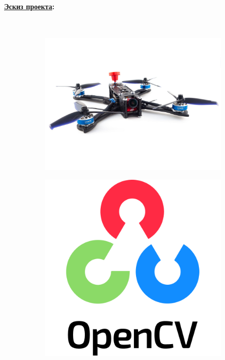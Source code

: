 \documentclass[a4paper,12pt]{article} %
\begin{document}
\paragraph{\underline{Эскиз проекта}:}\

\begin{figure}[h]
    \centering
    \begin{subfigure}{0.4\textwidth}
        \includegraphics[width=\linewidth]{../img/drone.jpg}
    \end{subfigure}
    \hfill
    \begin{subfigure}{0.2\textwidth}
        \includegraphics[width=\linewidth]{../img/opencv.png}

\end{subfigure}
\end{figure}
\end{document}
